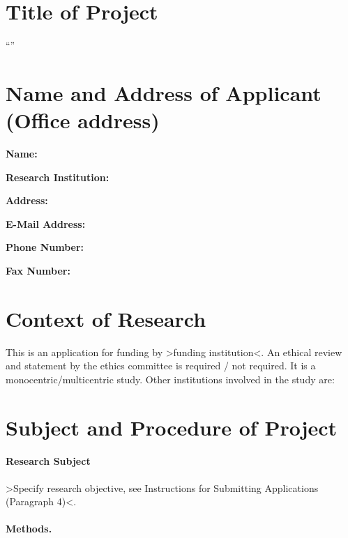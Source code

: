 \documentclass[11pt,twoside,a4paper]{article}
\begin{document}
\maketitle
\thispagestyle{fancy}

\section{Title of Project}

``\ProjectTitle''

\section{Name and Address of Applicant (Office address)}

\textbf{Name:} \ApplicantName{}

\textbf{Research Institution:} \ApplicantResearchInstitution{}

\textbf{Address:} \ApplicantAddress{}

\textbf{E-Mail Address:} \ApplicantEmailAddress{}

\textbf{Phone Number:} \ApplicantPhoneNumber{}

\textbf{Fax Number:} \ApplicantFaxNumber{}

\section{Context of Research}

This is an application for funding by >funding institution<.
An ethical review and statement by the ethics committee is required / not required.
It is a monocentric/multicentric study.
Other institutions involved in the study are:

\section{Subject and Procedure of Project}

\paragraph{Research Subject}

>Specify research objective, see Instructions for Submitting Applications (Paragraph 4)<.

\paragraph{Methods.}
\end{document}
